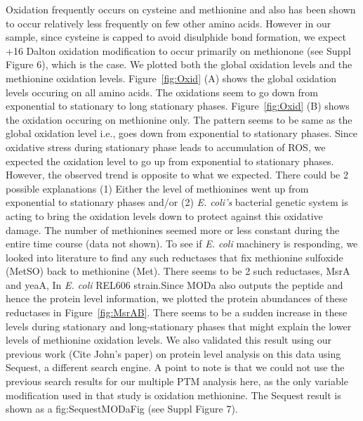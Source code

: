 \documentclass[12pt]{article}
\begin{document}
Oxidation frequently occurs on cysteine and methionine and also has been shown to occur relatively less frequently on few other amino acids. However in our sample, since cysteine is capped to avoid disulphide bond formation, we expect +16 Dalton oxidation modification to occur primarily on methionone (see Suppl Figure 6), which is the case. We plotted both the global oxidation levels and the methionine oxidation levels. Figure~\ref{fig:Oxid} (A) shows the global oxidation levels occuring on all amino acids. The oxidations seem to go down from exponential to stationary to long stationary phases. Figure~\ref{fig:Oxid} (B) shows the oxidation occuring on methionine only. The pattern seems to be same as the global oxidation level i.e., goes down from exponential to stationary phases. Since oxidative stress during stationary phase leads to accumulation of ROS, we expected the oxidation level to go up from exponential to stationary phases. However, the observed trend is opposite to what we expected. There could be 2 possible explanations (1) Either the level of methionines went up from exponential to stationary phases and/or (2) \emph{E. coli's} bacterial genetic system is acting to bring the oxidation levels down to protect against this oxidative damage. The number of methionines seemed more or less constant during the entire time course (data not shown). To see if \emph{E. coli} machinery is responding, we looked into literature to find any such reductases that fix methionine sulfoxide (MetSO) back to methionine (Met).  There seems to be 2 such reductases, MsrA and yeaA, In \emph{E. coli} REL606 strain.Since MODa also outputs the peptide and hence the protein level information, we plotted the protein abundances of these reductases in Figure~\ref{fig:MsrAB}. There seems to be a sudden increase in these levels during stationary and long-stationary phases that might explain the lower levels of methionine oxidation levels. We also validated this result using our previous work (Cite John's paper) on protein level analysis on this data using Sequest, a different search engine. A point to note is that we  could not use the previous search results for our multiple PTM analysis here, as the only variable modification used in that study is oxidation methionine. The Sequest result is shown as a fig:SequestMODaFig (see Suppl Figure 7).
\end{document}
